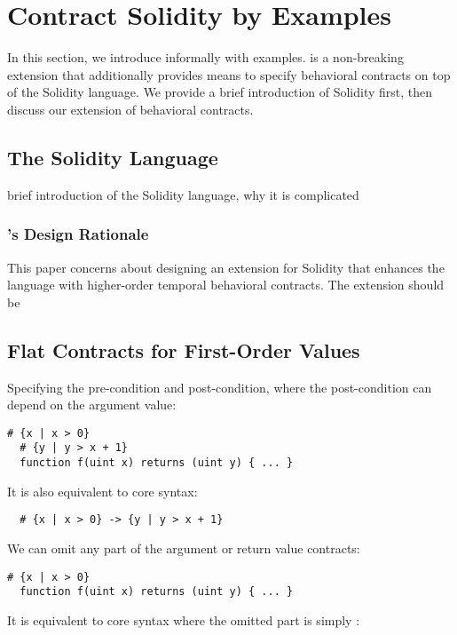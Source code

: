 \documentclass[acmsmall,review,anonymous]{acmart}\settopmatter{printfolios=true,printccs=false,printacmref=false}
\begin{document}
\section{Contract Solidity by Examples}

In this section, we introduce \lang informally with examples.
\lang is a non-breaking extension that additionally provides means
to specify behavioral contracts on top of the Solidity language. We provide
a brief introduction of Solidity first, then discuss our extension of behavioral
contracts.

\subsection{The Solidity Language}

brief introduction of the Solidity language, why it is complicated

\subsubsection*{\textbf{\lang's Design Rationale}}
This paper concerns about designing an extension for Solidity that enhances the
language with higher-order temporal behavioral contracts.
The extension should be

\subsection{Flat Contracts for First-Order Values}

Specifying the pre-condition and post-condition, where the post-condition
can depend on the argument value:

\begin{lstlisting}[language=Solidity]
  # {x | x > 0}
  # {y | y > x + 1}
  function f(uint x) returns (uint y) { ... }
\end{lstlisting}
It is also equivalent to core syntax:
\begin{lstlisting}
  # {x | x > 0} -> {y | y > x + 1}
\end{lstlisting}

We can omit any part of the argument or return value contracts:

\begin{lstlisting}[language=Solidity]
  # {x | x > 0}
  function f(uint x) returns (uint y) { ... }
\end{lstlisting}
It is equivalent to core syntax where the omitted part is simply :
\end{document}
